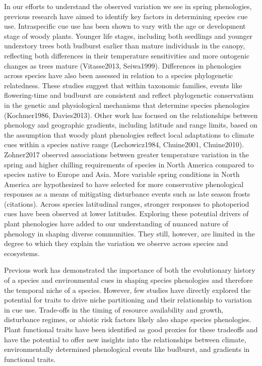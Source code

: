 \documentclass{article}\usepackage[]{graphicx}\usepackage[]{color}
\begin{document}
In our efforts to understand the observed variation we see in spring phenologies, previous research have aimed to identify key factors in determining species cue use. Intraspecific cue use has been shown to vary with the age or development stage of woody plants. Younger life stages, including both seedlings and younger understory trees both budburst earlier than mature individuals in the canopy, reflecting both differences in their temperature sensitivities and more ontogenic changes as trees mature (Vitasse2013, Seiwa1999). Differences in phenologies across species have also been assessed in relation to a species phylogenetic relatedness. These studies suggest that within taxonomic families, events like flowering-time and budburst are consistent and reflect phylogenetic conservatism in the genetic and physiological mechanisms that determine species phenologies (Kochmer1986, Davies2013). Other work has focused on the relationships between phenology and geographic gradients, including latitude and range limits, based on the assumption that woody plant phenologies reflect local adaptations to climate cues within a species native range (Lechowicz1984, Chuine2001, Chuine2010). Zohner2017 observed associations between greater temperature variation in the spring and higher chilling requirements of species in North America compared to species native to Europe and Asia. More variable spring conditions in North America are hypothesized to have selected for more conservative phenological responses as a means of mitigating disturbance events such as late season frosts (citations). Across species latitudinal ranges, stronger responses to photoperiod cues have been observed at lower latitudes. Exploring these potential drivers of plant phenologies have added to our understanding of nuanced nature of phenology in shaping diverse communities. They still, however, are limited in the degree to which they explain the variation we observe across species and ecosystems.

Previous work has demonstrated the importance of both the evolutionary history of a species and environmental cues in shaping species phenologies and therefore the temporal niche of a species. However, few studies have directly explored the potential for traits to drive niche partitioning and their relationship to variation in cue use. Trade-offs in the timing of resource availability and growth, disturbance regimes, or abiotic risk factors likely also shape species phenologies. Plant functional traits have been identified as good proxies for these tradeoffs and have the potential to offer new insights into the relationships between climate, environmentally determined phenological events like budburst, and gradients in functional traits.
\end{document}
